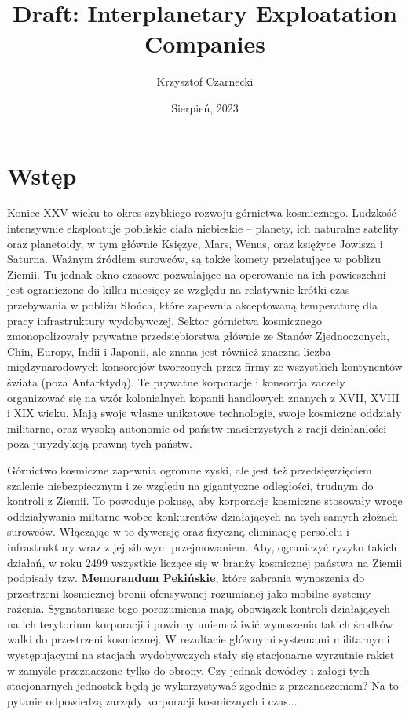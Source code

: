 \documentclass[11pt,a4paper]{article}
\begin{document}
\title{Draft: Interplanetary Exploatation Companies}
\author{Krzysztof Czarnecki}
\date{Sierpień, 2023}
\maketitle

\section{Wstęp}

Koniec XXV wieku to okres szybkiego rozwoju górnictwa kosmicznego. Ludzkość intensywnie eksploatuje pobliskie ciała niebieskie -- planety, ich naturalne satelity oraz planetoidy, w tym głównie Księzyc, Mars, Wenus, oraz księżyce Jowisza i Saturna. Ważnym źródłem surowców, są także komety przelatujące w poblizu Ziemii. Tu jednak okno czasowe pozwalające na operowanie na ich powieszchni jest ograniczone do kilku miesięcy ze względu na relatywnie krótki czas przebywania w pobliżu Słońca, które zapewnia akceptowaną temperaturę dla pracy infrastruktury wydobywczej. Sektor górnictwa kosmicznego zmonopolizowały prywatne przedsiębiorstwa głównie ze Stanów Zjednoczonych, Chin, Europy, Indii i Japonii, ale znana jest również znaczna liczba międzynarodowych konsorcjów tworzonych przez firmy ze wszystkich kontynentów świata (poza Antarktydą). Te prywatne korporacje i konsorcja zaczeły organizować się na wzór kolonialnych kopanii handlowych znanych z XVII, XVIII i XIX wieku. Mają swoje własne unikatowe technologie, swoje kosmiczne oddziały militarne, oraz wysoką autonomie od państw macierzystych z racji działanlości poza juryzdykcją prawną tych państw.  

Górnictwo kosmiczne zapewnia ogromne zyski, ale jest też przedsięwzięciem szalenie niebezpiecznym i ze względu na gigantyczne odległości, trudnym do kontroli z Ziemii. To powoduje pokusę, aby korporacje kosmiczne stosowały wroge oddziaływania miltarne wobec konkurentów działających na tych samych złożach surowców. Włączając w to dywersję oraz fizyczną eliminację persolelu i infrastruktury wraz z jej siłowym przejmowaniem. Aby, ograniczyć ryzyko takich działań, w roku 2499 wszystkie liczące się w branży kosmicznej państwa na Ziemii podpisały tzw. \textbf{Memorandum Pekińskie}, które zabrania wynoszenia do przestrzeni kosmicznej bronii ofensywanej rozumianej jako mobilne systemy rażenia. Sygnatariusze tego porozumienia mają obowiązek kontroli działających na ich terytorium korporacji i powinny uniemożliwić wynoszenia takich środków walki do przestrzeni kosmicznej. W rezultacie głównymi systemami militarnymi występującymi na stacjach wydobywczych stały się stacjonarne wyrzutnie rakiet w zamyśle przeznaczone tylko do obrony. Czy jednak dowódcy i załogi tych stacjonarnych jednostek będą je wykorzystywać zgodnie z przeznaczeniem? Na to pytanie odpowiedzą zarządy korporacji kosmicznych i czas...
\newpage
\end{document}
